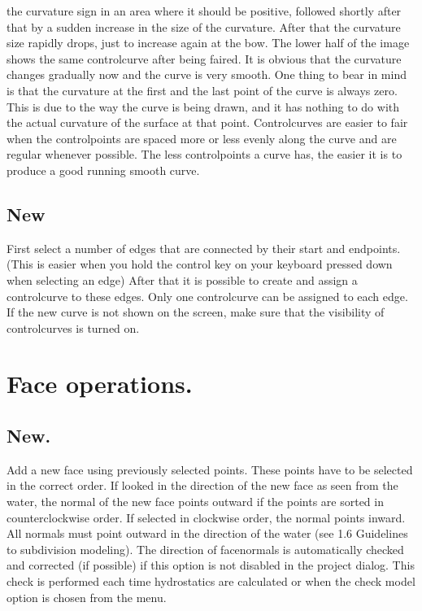 \documentclass[12pt]{article}
\begin{document}
the curvature sign in an area where it should be positive, followed shortly after that by a sudden
increase in the size of the curvature. After that the curvature size rapidly drops, just to increase
again at the bow. The lower half of the image shows the same controlcurve after being faired. It is
obvious that the curvature changes gradually now and the curve is very smooth.
One thing to bear in mind is that the curvature at the first and the last point of the curve is always
zero. This is due to the way the curve is being drawn, and it has nothing to do with the actual
curvature of the surface at that point. Controlcurves are easier to fair when the controlpoints are
spaced more or less evenly along the curve and are regular whenever possible. The less
controlpoints a curve has, the easier it is to produce a good running smooth curve.

\subsection{New}
First select a number of edges that are connected by their start and endpoints. (This is easier when
you hold the control key on your keyboard pressed down when selecting an edge) After that it is
possible to create and assign a controlcurve to these edges. Only one controlcurve can be assigned
to each edge. If the new curve is not shown on the screen, make sure that the visibility of
controlcurves is turned on.

\section{Face operations.}

\subsection{New.}
Add a new face using previously selected points. These points have to be selected in the correct
order. If looked in the direction of the new face as seen from the water, the normal of the new face
points outward if the points are sorted in counterclockwise order. If selected in clockwise order, the
normal points inward. All normals must point outward in the direction of the water (see 1.6
Guidelines to subdivision modeling). The direction of facenormals is automatically checked and
corrected (if possible) if this option is not disabled in the project dialog. This check is performed
each time hydrostatics are calculated or when the check model option is chosen from the menu.
\end{document}
